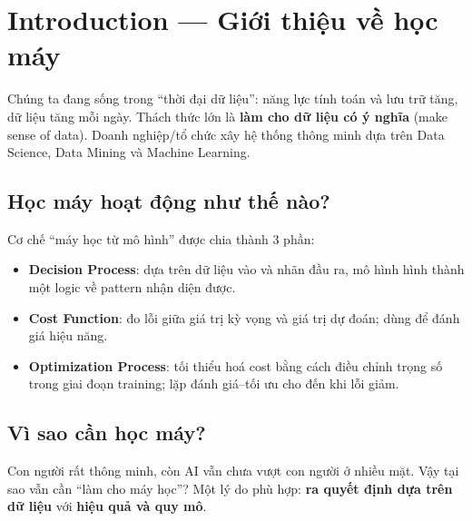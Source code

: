 \section{Introduction --- Giới thiệu về học máy}
\label{sec:introduction}

\begin{dongco}[title={Bối cảnh: thời đại dữ liệu}]
Chúng ta đang sống trong “thời đại dữ liệu”: năng lực tính toán và lưu trữ tăng, dữ liệu tăng mỗi ngày.
Thách thức lớn là \textbf{làm cho dữ liệu có ý nghĩa} (make sense of data).
Doanh nghiệp/tổ chức xây hệ thống thông minh dựa trên Data Science, Data Mining và Machine Learning.
\end{dongco}

\begin{vidu}[title={Hình minh hoạ quy trình ML}]
\end{vidu}

\subsection{Học máy hoạt động như thế nào?}

\begin{phuongphap}[title={3 thành phần chính}]
Cơ chế “máy học từ mô hình” được chia thành 3 phần:
\begin{itemize}
  \item \textbf{Decision Process}: dựa trên dữ liệu vào và nhãn đầu ra, mô hình hình thành một logic về pattern nhận diện được.
  \item \textbf{Cost Function}: đo lỗi giữa giá trị kỳ vọng và giá trị dự đoán; dùng để đánh giá hiệu năng.
  \item \textbf{Optimization Process}: tối thiểu hoá cost bằng cách điều chỉnh trọng số trong giai đoạn training; lặp đánh giá--tối ưu cho đến khi lỗi giảm.
\end{itemize}
\end{phuongphap}

\subsection{Vì sao cần học máy?}

\begin{dongco}[title={Quyết định dựa trên dữ liệu ở quy mô lớn}]
Con người rất thông minh, còn AI vẫn chưa vượt con người ở nhiều mặt.
Vậy tại sao vẫn cần “làm cho máy học”?
Một lý do phù hợp: \textbf{ra quyết định dựa trên dữ liệu} với \textbf{hiệu quả và quy mô}.
\end{dongco}

